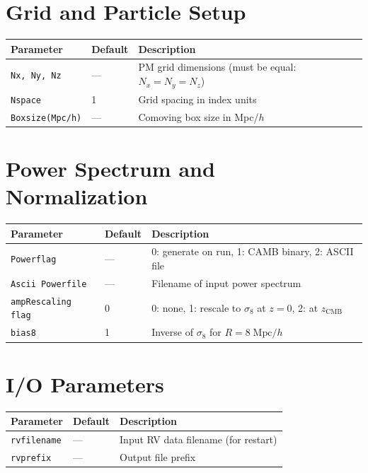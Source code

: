 \documentclass[11pt,fleqn]{book}
\newcommand{\code}[1]{\texttt{#1}}
\begin{document}
\section{Grid and Particle Setup}

\begin{longtable}{L{5cm} C{2cm} L{6.5cm}}
\toprule
\textbf{Parameter} & \textbf{Default} & \textbf{Description} \\
\midrule
\endhead
\code{Nx, Ny, Nz} & --- & PM grid dimensions (must be equal: $N_x = N_y = N_z$) \\
\code{Nspace} & 1 & Grid spacing in index units \\
\code{Boxsize(Mpc/h)} & --- & Comoving box size in Mpc/$h$ \\
\bottomrule
\end{longtable}

\section{Power Spectrum and Normalization}

\begin{longtable}{L{5cm} C{2cm} L{6.5cm}}
\toprule
\textbf{Parameter} & \textbf{Default} & \textbf{Description} \\
\midrule
\endhead
\code{Powerflag} & --- & 0: generate on run, 1: CAMB binary, 2: ASCII file \\
\code{Ascii Powerfile} & --- & Filename of input power spectrum \\
\code{ampRescaling flag} & 0 & 0: none, 1: rescale to $\sigma_8$ at $z=0$, 2: at $z_\text{CMB}$ \\
\code{bias8} & 1 & Inverse of $\sigma_8$ for $R = 8\;\text{Mpc}/h$ \\
\bottomrule
\end{longtable}

\section{I/O Parameters}

\begin{longtable}{L{5cm} C{2cm} L{6.5cm}}
\toprule
\textbf{Parameter} & \textbf{Default} & \textbf{Description} \\
\midrule
\endhead
\code{rvfilename} & --- & Input RV data filename (for restart) \\
\code{rvprefix} & --- & Output file prefix \\
\bottomrule
\end{longtable}
\end{document}
